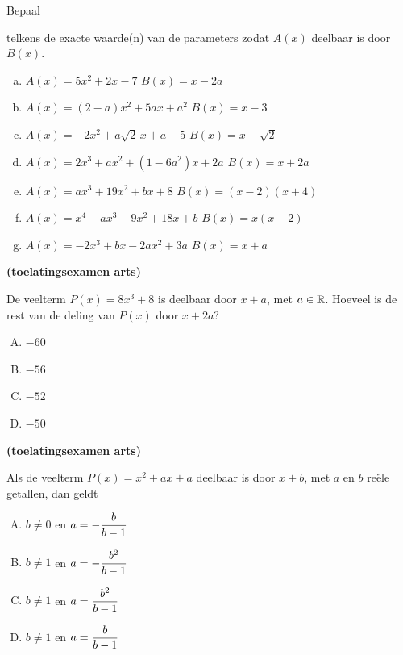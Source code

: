 \documentclass{ximera}
\begin{document}
\begin{Oefening}\setcounter{enumi}{7}  
\hypertarget{oef3.7}{Bepaal} telkens de exacte waarde(n) van de parameters zodat $A(x)$ deelbaar is door $B(x)$. 
\begin{enumerate}[(a)]
\item
$A(x) = 5x^2+2x-7$ \quad {} \quad $B(x) = x-2a$ 
\item
$A(x) = (2-a)x^2 + 5ax + a^2$ \quad {} \quad $B(x) = x-3$ 
\item
$A(x) = -2x^2 + a\sqrt{2}\,x + a-5$ \quad {} \quad $B(x) = x-\sqrt{2}$ 
\item
$A(x) = 2x^3 + ax^2 + (1-6a^2)x + 2a$ \quad {} \quad $B(x) = x+2a$ 
\item
$A(x) = ax^3 + 19x^2 + bx + 8$ \quad {} \quad $B(x) = (x-2)(x+4)$ 
\item
$A(x) = x^4 + ax^3 - 9x^2 + 18x + b$ \quad {} \quad $B(x) = x(x-2)$ 
\item 
$A(x) = -2x^3 + bx - 2ax^2 + 3a$ \quad {} \quad $B(x) = x+a$ 
\end{enumerate}
\end{Oefening}

\clearpage

\begin{Oefening}\setcounter{enumi}{8} 
\hypertarget{oef3.8}{{\bf (toelatingsexamen arts)}}
De veelterm $P(x) = 8x^3 + 8$ is deelbaar door $x+a$, met $a \in \mathbb{R}$. Hoeveel is de rest van de deling van $P(x)$ door $x+2a$?
\begin{multicols}{4} 
\begin{enumerate}[(A)]
\item 
$-60$ 
\item
$-56$ 
\item
$-52$ 
\item 
$-50$ 
\end{enumerate}
\end{multicols}
\end{Oefening}

\begin{Oefening}\setcounter{enumi}{9} 
\hypertarget{oef3.9}{{\bf (toelatingsexamen arts)}}
Als de veelterm $P(x) = x^2 + ax + a$ deelbaar is door $x+b$, met $a$ en $b$ re\"ele getallen, dan geldt
\begin{multicols}{2} 
\begin{enumerate}[(A)]
\item 
$b \neq 0$ en $\displaystyle a = -\frac{b}{b-1}$
\item
$b \neq 1$ en $\displaystyle a = -\frac{b^2}{b-1}$
\item
$b \neq 1$ en $\displaystyle a = \frac{b^2}{b-1}$
\item
$b \neq 1$ en $\displaystyle a = \frac{b}{b-1}$
\end{enumerate}
\end{multicols}
\end{Oefening}
\end{document}
